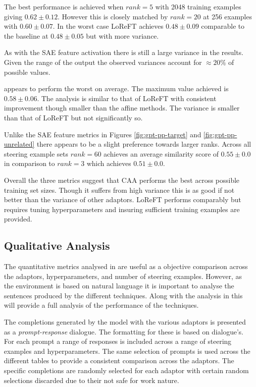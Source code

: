 The best performance is achieved when $rank = 5$ with 2048 training examples giving $0.62 \pm 0.12$.
However this is closely matched by $rank = 20$ at 256 examples with $0.60 \pm 0.07$.
In the worst case LoReFT achieves $0.48 \pm 0.09$ comparable to the baseline at $0.48 \pm 0.05$ but with more variance.

As with the SAE feature activation there is still a large variance in the results.
Given the range of the output the observed variances account for $\approx 20\%$ of possible values.

 appears to perform the worst on average.
The maximum value achieved is $0.58 \pm 0.06$.
The analysis is similar to that of LoReFT with consistent improvement though smaller than the affine methods.
The variance is smaller than that of LoReFT but not significantly so.

Unlike the SAE feature metrics in Figures \ref{fig:gpt-pp-target} and \ref{fig:gpt-pp-unrelated} there appears to be a slight preference towards larger ranks.
Across all steering example sets $rank = 60$ achieves an average similarity score of $0.55 \pm 0.0$ in comparison to $rank = 3$ which achieves $0.51 \pm 0.0$.

Overall the three metrics suggest that CAA performs the best across possible training set sizes.
Though it suffers from high variance this is as good if not better than the variance of other adaptors.
LoReFT performs comparably but requires tuning hyperparameters and insuring sufficient training examples are provided.

\subsection{Qualitative Analysis}
\label{sec:qual}

The quantitative metrics analysed in  are useful as a objective comparison across the adaptors, hyperparameters, and number of steering examples.
However, as the environment is based on natural language it is important to analyse the sentences produced by the different techniques.
Along with the analysis in  this will provide a full analysis of the performance of the techniques.

The completions generated by the model with the various adaptors is presented as a \emph{prompt-response} dialogue.
The formatting for these is based on \cites{mwe} dialogue's.
For each prompt a range of responses is included across a range of steering examples and hyperparameters.
The same selection of prompts is used across the different tables to provide a consistent comparison across the adaptors.
The specific completions are randomly selected for each adaptor with certain random selections discarded due to their not safe for work nature.

